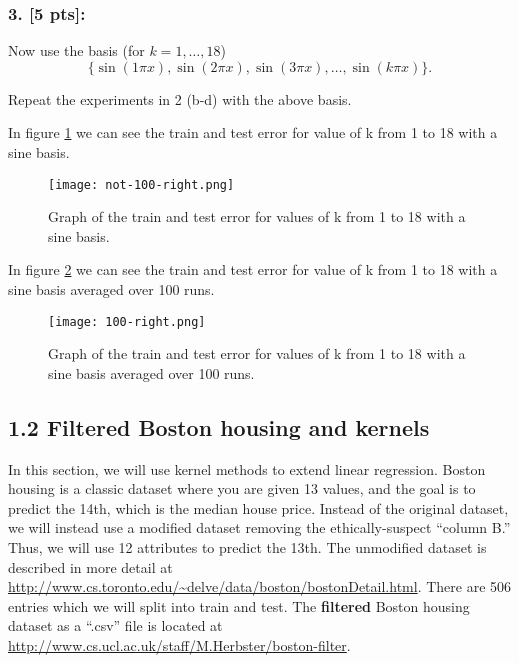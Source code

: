 \documentclass{article}
\begin{document}
\begin{enumerate}
    \subsubsection*{3. [5 pts]:}
    Now use the basis (for \(k = 1, \ldots, 18\))
    \[
    \{\sin(1\pi x), \sin(2\pi x), \sin(3\pi x), \ldots, \sin(k\pi x)\}.
    \]
    
    Repeat the experiments in 2 (b-d) with the above basis.

    In figure \ref{fig:not_100} we can see the train and test error for value of k from 1 to 18 with a sine basis.

    \begin{figure}[H]
        \centering
        \texttt{[image: not-100-right.png]}
        \caption{Graph of the train and test error for values of k from 1 to 18 with a sine basis.}
        \label{fig:not_100}
    \end{figure}

    In figure \ref{100} we can see the train and test error for value of k from 1 to 18 with a sine basis averaged over 100 runs.

    \begin{figure}[H]
        \centering
        \texttt{[image: 100-right.png]}
        \caption{Graph of the train and test error for values of k from 1 to 18 with a sine basis averaged over 100 runs.}
        \label{100}
    \end{figure}
\end{enumerate}

\subsection*{1.2 Filtered Boston housing and kernels}

In this section, we will use kernel methods to extend linear regression. Boston housing is a classic dataset where you are given 13 values, and the goal is to predict the 14th, which is the median house price. Instead of the original dataset, we will instead use a modified dataset removing the ethically-suspect ``column B.'' Thus, we will use 12 attributes to predict the 13th. The unmodified dataset is described in more detail at \url{http://www.cs.toronto.edu/~delve/data/boston/bostonDetail.html}. There are 506 entries which we will split into train and test.
The \textbf{filtered} Boston housing dataset as a ``.csv'' file is located at
\url{http://www.cs.ucl.ac.uk/staff/M.Herbster/boston-filter}.
\end{document}
